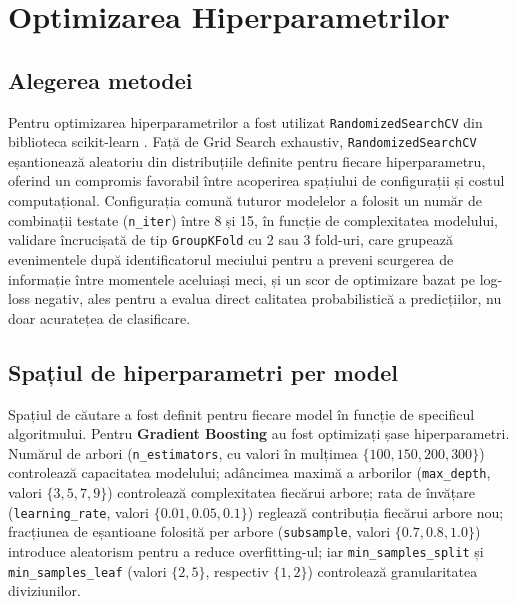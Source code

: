 \section{Optimizarea Hiperparametrilor}

\subsection{Alegerea metodei}

Pentru optimizarea hiperparametrilor a fost utilizat
\texttt{RandomizedSearchCV} din biblioteca scikit-learn \cite{ScikitLearn}.
Față de Grid Search exhaustiv, \texttt{RandomizedSearchCV} eșantionează
aleatoriu din distribuțiile definite pentru fiecare hiperparametru,
oferind un compromis favorabil între acoperirea spațiului de configurații
și costul computațional. Configurația comună tuturor modelelor a folosit
un număr de combinații testate (\texttt{n\_iter}) între 8 și 15, în funcție
de complexitatea modelului, validare încrucișată de tip \texttt{GroupKFold}
cu 2 sau 3 fold-uri, care grupează evenimentele după identificatorul
meciului pentru a preveni scurgerea de informație între momentele aceluiași
meci, și un scor de optimizare bazat pe log-loss negativ, ales pentru a
evalua direct calitatea probabilistică a predicțiilor, nu doar acuratețea
de clasificare.

\subsection{Spațiul de hiperparametri per model}

Spațiul de căutare a fost definit pentru fiecare model în funcție de
specificul algoritmului. Pentru \textbf{Gradient Boosting} au fost
optimizați șase hiperparametri. Numărul de arbori (\texttt{n\_estimators},
cu valori în mulțimea $\{100, 150, 200, 300\}$) controlează capacitatea
modelului; adâncimea maximă a arborilor (\texttt{max\_depth}, valori
$\{3, 5, 7, 9\}$) controlează complexitatea fiecărui arbore; rata de
învățare (\texttt{learning\_rate}, valori $\{0.01, 0.05, 0.1\}$) reglează
contribuția fiecărui arbore nou; fracțiunea de eșantioane folosită per
arbore (\texttt{subsample}, valori $\{0.7, 0.8, 1.0\}$) introduce
aleatorism pentru a reduce overfitting-ul; iar \texttt{min\_samples\_split}
și \texttt{min\_samples\_leaf} (valori $\{2, 5\}$, respectiv $\{1, 2\}$)
controlează granularitatea diviziunilor.

